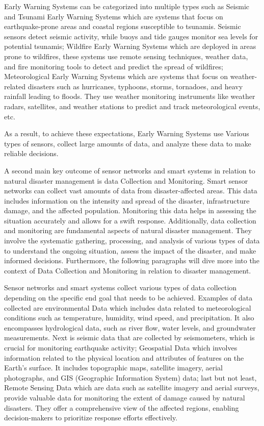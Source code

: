\documentclass[conference]{IEEEtran}
\begin{document}
Early Warning Systems can be categorized into multiple types such as Seismic and Tsunami Early Warning 
Systems which are systems that focus on earthquake-prone areas and coastal regions susceptible to tsunamis. 
Seismic sensors detect seismic activity, while buoys and tide gauges monitor sea levels for potential 
tsunamis; Wildfire Early Warning Systems which are deployed in areas prone to wildfires, these systems 
use remote sensing techniques, weather data, and fire monitoring tools to detect and predict the spread 
of wildfires; Meteorological Early Warning Systems which are systems that focus on weather-related 
disasters such as hurricanes, typhoons, storms, tornadoes, and heavy rainfall leading to floods. 
They use weather monitoring instruments like weather radars, satellites, and weather stations to 
predict and track meteorological events, etc.\par

As a result, to achieve these expectations, Early Warning Systems use Various types of sensors, 
collect large amounts of data, and analyze these data to make reliable decisions. \par

A second main key outcome of sensor networks and smart systems in relation to natural disaster management 
is data Collection and Monitoring. Smart sensor networks can collect vast amounts of data from 
disaster-affected areas. This data includes information on the intensity and spread of the disaster, 
infrastructure damage, and the affected population. Monitoring this data helps in assessing the 
situation accurately and allows for a swift response. Additionally, data collection and monitoring 
are fundamental aspects of natural disaster management. They involve the systematic gathering, 
processing, and analysis of various types of data to understand the ongoing situation, assess the 
impact of the disaster, and make informed decisions. Furthermore, the following paragraphs will 
dive more into the context of Data Collection and Monitoring in relation to disaster management.\par

Sensor networks and smart systems collect various types of data collection depending on the specific 
end goal that needs to be achieved. Examples of data collected are environmental Data which includes 
data related to meteorological conditions such as temperature, humidity, wind speed, and precipitation. 
It also encompasses hydrological data, such as river flow, water levels, and groundwater measurements. 
Next is seismic data that are collected by seismometers, which is crucial for monitoring earthquake 
activity; Geospatial Data which involves information related to the physical location and attributes 
of features on the Earth's surface. It includes topographic maps, satellite imagery, aerial photographs, 
and GIS (Geographic Information System) data; last but not least, Remote Sensing Data which are data such 
as satellite imagery and aerial surveys, provide valuable data for monitoring the extent of damage 
caused by natural disasters. They offer a comprehensive view of the affected regions, enabling 
decision-makers to prioritize response efforts effectively.\par
\end{document}
